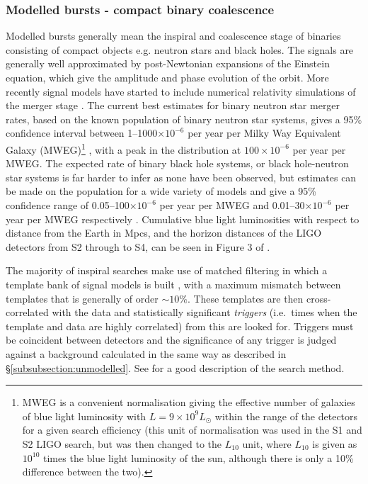 \documentclass{article}
\begin{document}
\subsubsection{Modelled bursts - compact binary coalescence}
Modelled bursts generally mean the inspiral and coalescence stage of binaries
consisting of compact objects e.g. neutron stars and black holes. The signals
are generally well approximated by post-Newtonian expansions of the Einstein
equation, which give the amplitude and phase evolution of the orbit. More recently signal
models have started to include numerical relativity simulations of the
merger stage \cite{Aylott:2009}. The current best estimates for binary neutron
star merger rates, based on the known population of binary neutron star systems,
gives a 95\% confidence interval between 1--1000$\times10^{-6}$ per year per 
Milky Way Equivalent Galaxy (MWEG)\footnote{MWEG is
a convenient normalisation giving the effective number of galaxies of blue
light luminosity with $L = 9\times10^9L_{\odot}$ within the range of the
detectors for a given search efficiency (this unit of normalisation was used in
the S1 and S2 LIGO search, but was then changed to the $L_{10}$ unit, where $L_{10}$ is
given as $10^{10}$ times the blue light luminosity of the sun, although
there is only a 10\% difference between the two).} \cite{Abadie:2010e, 
Kalogera:2004a, Kalogera:2004b}, with a peak in the distribution
at $100\times10^{-6}$ per year per MWEG. The expected rate
of binary black hole systems, or black hole-neutron star systems is far harder
to infer as none have been observed, but estimates can be made on the population
for a wide variety of models and give a 95\% confidence range of
0.05--100$\times10^{-6}$ per year per MWEG and 0.01--30$\times10^{-6}$ per year per MWEG
respectively \cite{Abadie:2010e, OShaughnessy:2005, OShaughnessy:2008, Abbott:2008a}.
Cumulative blue light luminosities with respect to distance from the Earth in
Mpcs, and the horizon distances of the LIGO detectors from S2 through to S4,
can be seen in Figure 3 of \cite{Abbott:2008a}.

The majority of inspiral searches make use of matched filtering in which a
template bank of signal models is built \cite{Owen:1996, Owen:1999}, with a
maximum mismatch between templates that is generally of order $\sim10\%$. These
templates are then cross-correlated with the data and statistically significant
{\it triggers} (i.e.\ times when the template and data are highly correlated)
from this are looked for. Triggers must be coincident between detectors and the
significance of any trigger is judged against a background calculated in the
same way as described in \S\ref{subsubsection:unmodelled}. See
\cite{Abbott:2005b} for a good description of the search method.
\end{document}
